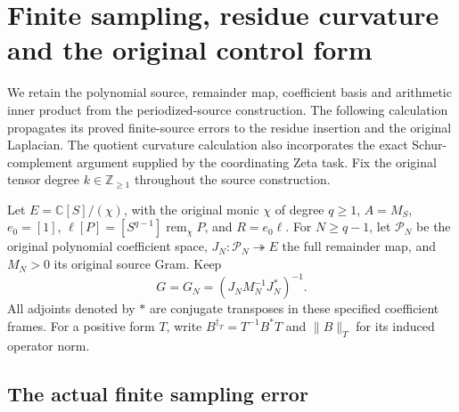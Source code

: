 \documentclass{article}
\begin{document}
\maketitle
\section{Finite sampling, residue curvature and the original control form}
\label{sec:periodized-curvature-control}

We retain the polynomial source, remainder map, coefficient basis and
arithmetic inner product from the periodized-source construction. The
following calculation propagates its proved finite-source errors to the
residue insertion and the original Laplacian. The quotient curvature
calculation also incorporates the exact Schur-complement argument supplied
by the coordinating Zeta task. Fix the original tensor degree
$k\in\mathbb Z_{\ge1}$ throughout the source construction.

Let $E=\mathbb C[S]/(\chi)$, with the original monic $\chi$ of degree
$q\ge1$, $A=M_S$, $e_0=[1]$, $\ell[P]=[S^{q-1}]\operatorname{rem}_\chi P$,
and $R=e_0\ell$. For $N\ge q-1$, let $\mathcal P_N$ be the original
polynomial coefficient space, $J_N:\mathcal P_N\twoheadrightarrow E$
the full remainder map, and $M_N>0$ its original source Gram. Keep
\[
 G=G_N=(J_NM_N^{-1}J_N^*)^{-1}.
 \tag{FC1}
\]
All adjoints denoted by $*$ are conjugate transposes in these specified
coefficient frames. For a positive form $T$, write
$B^{\dagger_T}=T^{-1}B^*T$ and $\|B\|_T$ for its induced operator norm.

\subsection{The actual finite sampling error}
\end{document}
